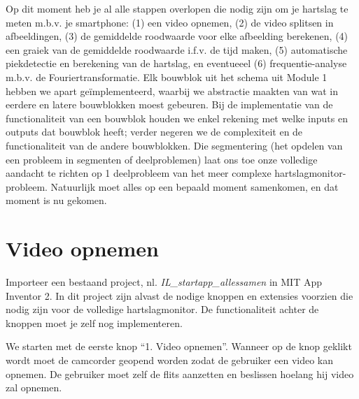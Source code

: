 
\begin{samenvatting}
	Op dit moment heb je al alle stappen overlopen die nodig zijn om je hartslag te meten m.b.v. je smartphone: (1) een video opnemen, (2) de video splitsen in afbeeldingen, (3) de gemiddelde roodwaarde voor elke afbeelding berekenen, (4) een graiek van de gemiddelde roodwaarde i.f.v. de tijd maken, (5) automatische piekdetectie en berekening van de hartslag, en eventueeel (6) frequentie-analyse m.b.v. de Fouriertransformatie. 
	Elk bouwblok uit het schema uit Module 1 hebben we apart ge\"implementeerd, waarbij we abstractie maakten van wat in eerdere en latere bouwblokken moest gebeuren.
	Bij de implementatie van de functionaliteit van een bouwblok houden we enkel rekening met welke inputs en outputs dat bouwblok heeft; verder negeren we de complexiteit en de functionaliteit van de andere bouwblokken.
	Die segmentering (het opdelen van een probleem in segmenten of deelproblemen) laat ons toe onze volledige aandacht te richten op 1 deelprobleem van het meer complexe hartslagmonitor-probleem.
	Natuurlijk moet alles op een bepaald moment samenkomen, en dat moment is nu gekomen.
\end{samenvatting}
%

\section{Video opnemen}
\label{sec:Mod5_Sec1}
%
Importeer een bestaand project, nl. \emph{IL\_startapp\_allessamen} in MIT App Inventor 2. 
In dit project zijn alvast de nodige knoppen en extensies voorzien die nodig zijn voor de volledige hartslagmonitor. 
De functionaliteit achter de knoppen moet je zelf nog implementeren.

We starten met de eerste knop \textquotedblleft 1. Video opnemen\textquotedblright. Wanneer op de knop geklikt wordt moet de camcorder geopend worden zodat de gebruiker een video kan opnemen. De gebruiker moet zelf de flits aanzetten en beslissen hoelang hij video zal opnemen.

